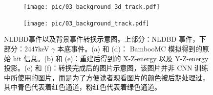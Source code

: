 \begin{figure}
        \begin{subfigure}[t]{0.22\textwidth}
          \centering
          \texttt{[image: pic/03\_background\_3d\_track.pdf]}
          \caption{}
        \end{subfigure}
        \begin{subfigure}[t]{0.44\textwidth}
          \centering
          \texttt{[image: pic/03\_background\_track.pdf]}
          \caption{}
        \end{subfigure}
        \begin{subfigure}[t]{0.16\textwidth}
          \centering
          \setlength{\fboxsep}{0pt}
          \caption{}
        \end{subfigure}
        
        \caption{NLDBD事件以及背景事件转换示意图。上部分：\xeots NLDBD 事件，下部分：2447keV $\gamma$ 本底事件。(a) 和 (d)： BambooMC 模拟得到的原始 hit 信息。(b) 和 (e)：重建后得到的 X-Z-energy 以及 Y-Z-energy 投影。(c) 和 (f)：转换完成后的图片示意图，该图片并非 CNN 训练中所使用的图片，而是为了方便读者观看图片的颜色被后期处理过，其中青色代表着红色通道，粉红色代表着绿色通道。}
        \label{fig:image_mapping}
        \end{figure}

        
